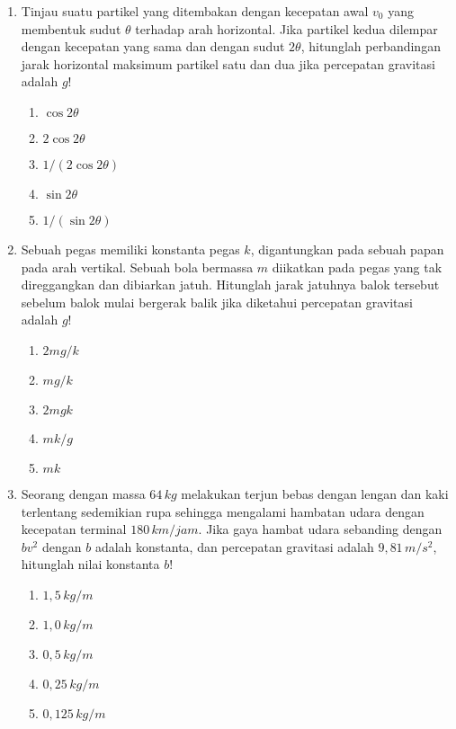 \documentclass[A4,12PT, english, twocolumn]{journal}
\begin{document}
\begin{enumerate}
\item Tinjau suatu partikel yang ditembakan dengan kecepatan awal $v_0$ yang membentuk sudut $\theta$ terhadap arah horizontal. Jika partikel kedua dilempar dengan kecepatan yang sama dan dengan sudut $2\theta$, hitunglah perbandingan jarak horizontal maksimum partikel satu dan dua jika percepatan gravitasi adalah $g$!
    \begin{enumerate}
        \item $\cos{2\theta}$
        \item $2\cos{2\theta}$
        \item $1/(2\cos{2\theta})$
        \item $\sin{2\theta}$
        \item $1/(\sin{2\theta})$
    \end{enumerate}
   
\item Sebuah pegas memiliki konstanta pegas $k$, digantungkan pada sebuah papan pada arah vertikal. Sebuah bola bermassa $m$ diikatkan pada pegas yang tak direggangkan dan dibiarkan jatuh. Hitunglah jarak jatuhnya balok tersebut sebelum balok mulai bergerak balik jika diketahui percepatan gravitasi adalah $g$!
    \begin{enumerate}
        \item $2mg/k$
        \item $mg/k$
        \item $2mgk$
        \item $mk/g$
        \item $mk$
    \end{enumerate}

\item Seorang dengan massa $64 \, kg$ melakukan terjun bebas dengan lengan dan kaki terlentang sedemikian rupa sehingga mengalami hambatan udara dengan kecepatan terminal $180 \, km/jam$. Jika gaya hambat udara sebanding dengan $bv^2$ dengan $b$ adalah konstanta, dan percepatan gravitasi adalah $9,81 \, m/s^2$, hitunglah nilai konstanta $b$!
    \begin{enumerate}
        \item $1,5 \, kg/m$
        \item $1,0 \, kg/m$
        \item $0,5 \, kg/m$
        \item $0,25 \, kg/m$
        \item $0,125 \, kg/m$
    \end{enumerate}


\end{enumerate}
\end{document}
